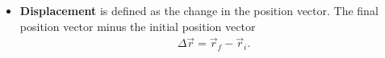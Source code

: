 \documentclass{report}
\begin{document}
\begin{itemize}
\begin{figure}[ht]
        \centering
        \label{fig:try2}
    \end{figure}
    \item \textbf{Displacement} is defined as the change in the position vector. The final position vector minus the initial position vector
        \begin{align*}
            \Delta \vec{r} = \vec{r}_{f} - \vec{r}_{i}
        .\end{align*}
    \begin{figure}[ht]
        \centering
        \label{fig:hellowrold}
    \end{figure}






    \end{itemize}

    \pagebreak 
\end{document}

